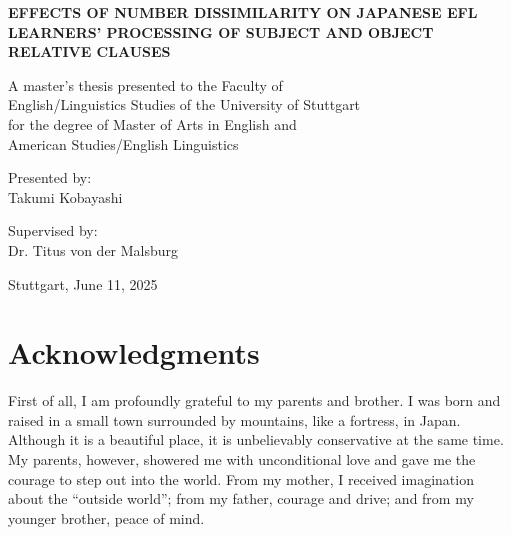 \documentclass[
]{article}
\author{}
\date{\vspace{-2.5em}}
\begin{document}
\begin{titlepage}
  \centering
  \vspace*{4cm}

  {\fontsize{24}{28}\selectfont \textbf{EFFECTS OF NUMBER DISSIMILARITY ON JAPANESE EFL LEARNERS' PROCESSING OF SUBJECT AND OBJECT RELATIVE CLAUSES}\par}
  \vspace{1.5cm}

  {\fontsize{16}{20}\selectfont
  A master’s thesis presented to the Faculty of \\
  English/Linguistics Studies of the University of Stuttgart \\
  for the degree of Master of Arts in English and \\
  American Studies/English Linguistics
  \par}
  \vspace{2cm}

  {\fontsize{16}{20}\selectfont Presented by: \\
  Takumi Kobayashi \par}
  \vspace{1cm}

  {\fontsize{16}{20}\selectfont Supervised by: \\
  Dr. Titus von der Malsburg \par}
  \vfill

  {\fontsize{14}{18}\selectfont Stuttgart, June 11, 2025 \par}
\end{titlepage}

\clearpage
\thispagestyle{empty}  
\setcounter{page}{1}

\clearpage
\thispagestyle{plain}  
\setcounter{page}{2}   
\section*{Acknowledgments}
\vspace*{1.5cm}

First of all, I am profoundly grateful to my parents and brother. I was
born and raised in a small town surrounded by mountains, like a
fortress, in Japan. Although it is a beautiful place, it is unbelievably
conservative at the same time. My parents, however, showered me with
unconditional love and gave me the courage to step out into the world.
From my mother, I received imagination about the ``outside world''; from
my father, courage and drive; and from my younger brother, peace of
mind.
\end{document}
